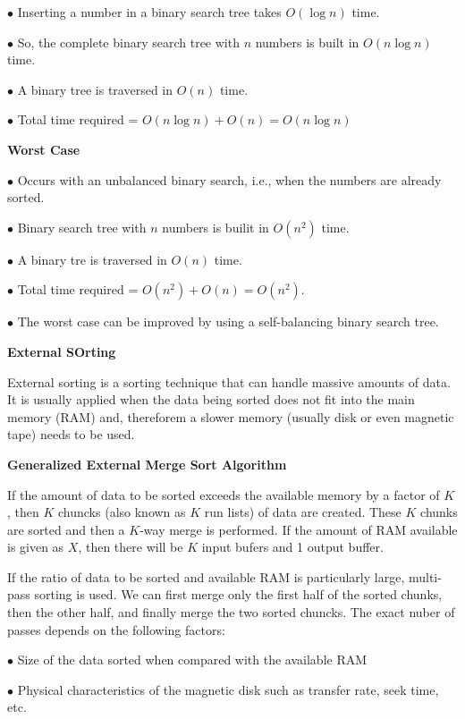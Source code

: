 \vskip 3mm
\qquad$\bullet$ Inserting a number in a binary search tree takes $O(\log n)$ time.

\vskip 3mm
\qquad$\bullet$ So, the complete binary search tree with $n$ numbers is built in $O(n\log n)$ time.

\vskip 3mm
\qquad$\bullet$ A binary tree is traversed in $O(n)$ time.

\vskip 3mm
\qquad$\bullet$ Total time required = $O(n\log n)+O(n)=O(n\log n)$

\vskip 3mm
{\bf Worst Case}

\vskip 3mm
\qquad$\bullet$ Occurs with an unbalanced binary search, i.e., when the numbers are already sorted.

\vskip 3mm
\qquad$\bullet$ Binary search tree with $n$ numbers is builit in $O(n^2)$ time.

\vskip 3mm
\qquad$\bullet$ A binary tre is traversed in $O(n)$ time.

\vskip 3mm
\qquad$\bullet$ Total time required = $O(n^2)+O(n)=O(n^2)$.

\vskip 3mm
\qquad$\bullet$ The worst case can be improved by using a self-balancing binary search tree.

\filbreak
\vskip 1cm
{\bf External SOrting}

\vskip 1mm
External sorting is a sorting technique that can handle massive amounts of data. It is usually applied when the data being sorted  does not fit into the main memory (RAM) and, thereforem a slower memory (usually disk or even magnetic tape) needs to be used.

\vskip 3mm
{\bf Generalized External Merge Sort Algorithm}

\vskip 1mm
If the amount of data to be sorted exceeds the available memory by a factor of $K$, then $K$ chuncks (also known as $K$ run lists) of data are created. These $K$ chunks are sorted and then a $K$-way merge is performed. If the amount of RAM available is given as $X$, then there will be $K$ input bufers and 1 output buffer.

\vskip 1mm
If the ratio of data to be sorted and available RAM is particularly large, multi-pass sorting is used. We can first merge only the first half of the sorted chunks, then the other half, and finally merge the two sorted chuncks. The exact nuber of passes depends on the following factors:

\vskip 3mm
\qquad$\bullet$ Size of the data sorted when compared with the available RAM

\vskip 3mm
\qquad$\bullet$ Physical characteristics of the magnetic disk such as transfer rate, seek time, etc.

